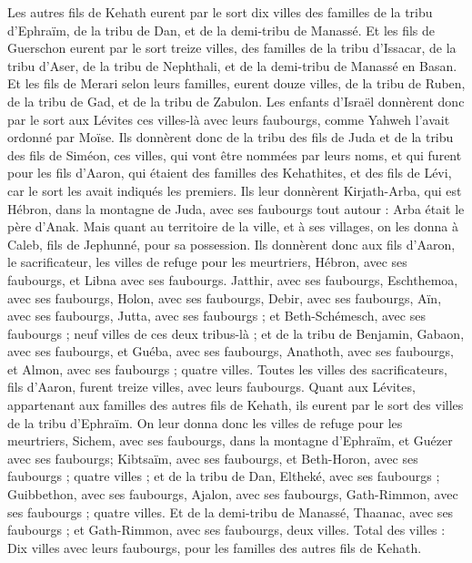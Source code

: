 \begin{multicols}{2}
Les autres fils de Kehath eurent par le sort dix villes des familles de la tribu d'Ephraïm, de la tribu de Dan, et de la demi-tribu de Manassé.
Et les fils de Guerschon eurent par le sort treize villes, des familles de la tribu d'Issacar, de la tribu d'Aser, de la tribu de Nephthali, et de la demi-tribu de Manassé en Basan.
Et les fils de Merari selon leurs familles, eurent douze villes, de la tribu de Ruben, de la tribu de Gad, et de la tribu de Zabulon.
Les enfants d'Israël donnèrent donc par le sort aux Lévites ces villes-là avec leurs faubourgs, comme Yahweh l'avait ordonné par Moïse.
Ils donnèrent donc de la tribu des fils de Juda et de la tribu des fils de Siméon, ces villes, qui vont être nommées par leurs noms,
et qui furent pour les fils d'Aaron, qui étaient des familles des Kehathites, et des fils de Lévi, car le sort les avait indiqués les premiers.
Ils leur donnèrent Kirjath-Arba, qui est Hébron, dans la montagne de Juda, avec ses faubourgs tout autour : Arba était le père d'Anak.
Mais quant au territoire de la ville, et à ses villages, on les donna à Caleb, fils de Jephunné, pour sa possession.
Ils donnèrent donc aux fils d'Aaron, le sacrificateur, les villes de refuge pour les meurtriers, Hébron, avec ses faubourgs, et Libna avec ses faubourgs.
Jatthir, avec ses faubourgs, Eschthemoa, avec ses faubourgs,
Holon, avec ses faubourgs, Debir, avec ses faubourgs,
Aïn, avec ses faubourgs, Jutta, avec ses faubourgs ; et Beth-Schémesch, avec ses faubourgs ; neuf villes de ces deux tribus-là ;
et de la tribu de Benjamin, Gabaon, avec ses faubourgs, et Guéba, avec ses faubourgs,
Anathoth, avec ses faubourgs, et Almon, avec ses faubourgs ; quatre villes.
Toutes les villes des sacrificateurs, fils d'Aaron, furent treize villes, avec leurs faubourgs.
Quant aux Lévites, appartenant aux familles des autres fils de Kehath, ils eurent par le sort des villes de la tribu d'Ephraïm.
On leur donna donc les villes de refuge pour les meurtriers, Sichem, avec ses faubourgs, dans la montagne d'Ephraïm, et Guézer avec ses faubourgs;
Kibtsaïm, avec ses faubourgs, et Beth-Horon, avec ses faubourgs ; quatre villes ;
et de la tribu de Dan, Eltheké, avec ses faubourgs ; Guibbethon, avec ses faubourgs,
Ajalon, avec ses faubourgs, Gath-Rimmon, avec ses faubourgs ; quatre villes.
Et de la demi-tribu de Manassé, Thaanac, avec ses faubourgs ; et Gath-Rimmon, avec ses faubourgs, deux villes.
Total des villes : Dix villes avec leurs faubourgs, pour les familles des autres fils de Kehath.

\end{multicols}
